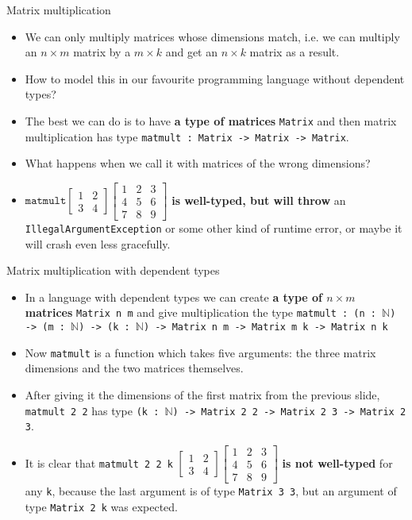 \documentclass{beamer}
\newcommand{\m}[1]{\texttt{#1}}
\begin{document}
\begin{frame}{Matrix multiplication}
\begin{itemize}
	\item We can only multiply matrices whose dimensions match, i.e. we can multiply an $n \times m$ matrix by a $m \times k$ and get an $n \times k$ matrix as a result.
	\item How to model this in our favourite programming language without dependent types?
	\item The best we can do is to have \textbf{a type of matrices} \m{Matrix} and then matrix multiplication has type \m{matmult :\ Matrix -> Matrix -> Matrix}.
	\item What happens when we call it with matrices of the wrong dimensions?
	\item $\m{matmult} \begin{bmatrix}1 & 2\\3 & 4\end{bmatrix} \begin{bmatrix}1 & 2 & 3\\4 & 5 & 6\\7 & 8 & 9\end{bmatrix}$ \textbf{is well-typed, but will throw} an \m{IllegalArgumentException} or some other kind of runtime error, or maybe it will crash even less gracefully.
\end{itemize}
\end{frame}

\begin{frame}{Matrix multiplication with dependent types}
\begin{itemize}
	\item In a language with dependent types we can create \textbf{a type of $n \times m$ matrices} \m{Matrix n m} and give multiplication the type \m{matmult : (n :\ $\mathbb{N}$) ->  (m :\ $\mathbb{N}$) -> (k :\ $\mathbb{N}$) -> Matrix n m -> Matrix m k -> Matrix n k}
	\item Now \m{matmult} is a function which takes five arguments: the three matrix dimensions and the two matrices themselves.
	\item After giving it the dimensions of the first matrix from the previous slide, \m{matmult 2 2} has type \m{(k :\ $\mathbb{N}$) -> Matrix 2 2 -> Matrix 2 3 -> Matrix 2 3}.
	\item It is clear that \m{matmult 2 2 k} $\begin{bmatrix}1 & 2\\3 & 4\end{bmatrix} \begin{bmatrix}1 & 2 & 3\\4 & 5 & 6\\7 & 8 & 9\end{bmatrix}$ \textbf{is not well-typed} for any \m{k}, because the last argument is of type \m{Matrix 3 3}, but an argument of type \m{Matrix 2 k} was expected.
\end{itemize}
\end{frame}
\end{document}
